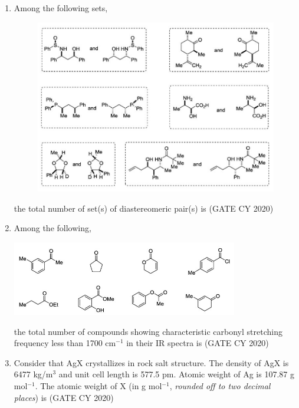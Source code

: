 \documentclass[12pt]{article}
\begin{document}
\begin{enumerate}
\item Among the following sets,

\begin{center}
\begin{figure}[H]
\includegraphics[width=0.6\columnwidth]{figs/q44.png}
\end{figure}

\end{center}

the total number of set(s) of diastereomeric pair(s) is \underline{\hspace{2cm}}
\hfill (GATE CY 2020)

\item Among the following,

\begin{center}
\includegraphics[width=0.7\columnwidth]{figs/q45.png}
\label{fig:q45}
\end{center}

the total number of compounds showing characteristic carbonyl stretching frequency less than 1700 cm$^{-1}$ in their IR spectra is \underline{\hspace{2cm}}
\hfill (GATE CY 2020)

\item Consider that AgX crystallizes in rock salt structure. The density of AgX is 6477 kg/m$^3$ and unit cell length is 577.5 pm. Atomic weight of Ag is 107.87 g mol$^{-1}$. The atomic weight of X (in g mol$^{-1}$, \textit{rounded off to two decimal places}) is \underline{\hspace{2cm}}
\hfill (GATE CY 2020)


\end{enumerate}
\end{document}
